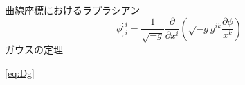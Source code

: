 \documentclass{jsarticle}
\begin{document}
曲線座標におけるラプラシアン
\begin{equation}
    \phi^{;i}_{;i} = 
    \frac{1}{\sqrt{-g}}
    \frac{\partial}{\partial{x^{i}}}
    \left(
        \sqrt{-g}g^{ik} \frac{\partial\phi}{x^{k}}
    \right)
\end{equation}
ガウスの定理


\ref{eq:Dg}
\end{document}
